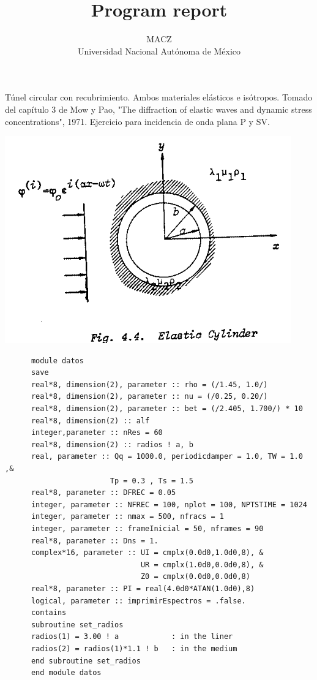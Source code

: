 \documentclass [11pt,spanish]{article}
\begin{document}
\title {Program report}
\author {MACZ\\
Universidad Nacional Aut\'onoma de M\'exico}
\maketitle 

\graphicspath{{./fig/}}

Túnel circular con recubrimiento. Ambos materiales elásticos e isótropos. Tomado del capítulo 3 de Mow y Pao, "The diffraction of elastic waves and dynamic stress concentrations", 1971. 
Ejercicio para incidencia de onda plana P y SV.

\includegraphics[scale=0.5]{figura}
\begingroup
\fontsize{10pt}{12pt}
\selectfont
{}
\begin{shaded}
\begin{verbatim}
      module datos
      save
      real*8, dimension(2), parameter :: rho = (/1.45, 1.0/)
      real*8, dimension(2), parameter :: nu = (/0.25, 0.20/)
      real*8, dimension(2), parameter :: bet = (/2.405, 1.700/) * 10
      real*8, dimension(2) :: alf
      integer,parameter :: nRes = 60
      real*8, dimension(2) :: radios ! a, b 
      real, parameter :: Qq = 1000.0, periodicdamper = 1.0, TW = 1.0 ,& 
                        Tp = 0.3 , Ts = 1.5
      real*8, parameter :: DFREC = 0.05
      integer, parameter :: NFREC = 100, nplot = 100, NPTSTIME = 1024
      integer, parameter :: nmax = 500, nfracs = 1
      integer, parameter :: frameInicial = 50, nframes = 90
      real*8, parameter :: Dns = 1.
      complex*16, parameter :: UI = cmplx(0.0d0,1.0d0,8), &
                               UR = cmplx(1.0d0,0.0d0,8), &
                               Z0 = cmplx(0.0d0,0.0d0,8)
      real*8, parameter :: PI = real(4.0d0*ATAN(1.0d0),8)
      logical, parameter :: imprimirEspectros = .false.
      contains
      subroutine set_radios
      radios(1) = 3.00 ! a            : in the liner
      radios(2) = radios(1)*1.1 ! b   : in the medium
      end subroutine set_radios
      end module datos
\end{verbatim}
\end{shaded}
\endgroup
\end{document}
